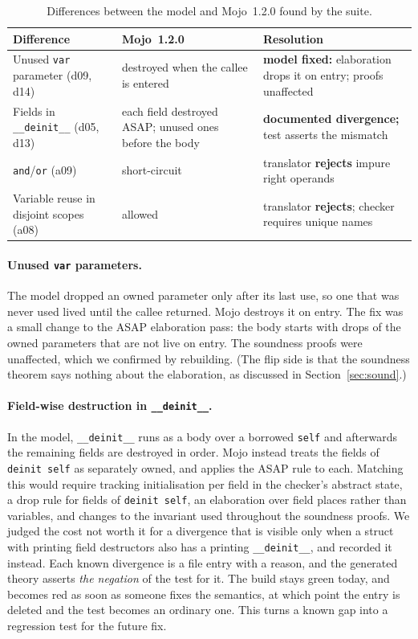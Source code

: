 \documentclass[11pt,a4paper]{article}
\newcommand{\code}[1]{\texttt{#1}}
\begin{document}
\begin{table}[t]
\centering
\begin{tabular}{@{}p{3.2cm}p{5.3cm}p{4.6cm}@{}}
\toprule
Difference & Mojo~1.2.0 & Resolution\\
\midrule
Unused \code{var} parameter (d09, d14) &
 destroyed when the callee is entered &
 \textbf{model fixed:} elaboration drops it on entry; proofs unaffected\\[0.4em]
Fields in \code{\_\_deinit\_\_} (d05, d13) &
 each field destroyed ASAP; unused ones before the body &
 \textbf{documented divergence;} test asserts the mismatch\\[0.4em]
\code{and}/\code{or} (a09) &
 short-circuit &
 translator \textbf{rejects} impure right operands\\[0.4em]
Variable reuse in disjoint scopes (a08) &
 allowed &
 translator \textbf{rejects}; checker requires unique names\\
\bottomrule
\end{tabular}
\caption{Differences between the model and Mojo~1.2.0 found by the suite.}
\label{tab:diffs}
\end{table}

\paragraph{Unused \code{var} parameters.}
The model dropped an owned parameter only after its last use, so one that was
never used lived until the callee returned. Mojo destroys it on entry. The fix
was a small change to the ASAP elaboration pass: the body starts with drops of the
owned parameters that are not live on entry. The soundness proofs
were unaffected, which we confirmed by rebuilding. (The flip side is that the
soundness theorem says nothing about the elaboration, as discussed in
Section~\ref{sec:sound}.)

\paragraph{Field-wise destruction in \code{\_\_deinit\_\_}.}
In the model, \code{\_\_deinit\_\_} runs as a body over a borrowed \code{self}
and afterwards the remaining fields are destroyed in order. Mojo instead treats
the fields of \code{deinit self} as separately owned, and applies the ASAP rule
to each. Matching this would require tracking initialisation per field in the
checker's abstract state, a drop rule for fields of \code{deinit self}, an
elaboration over field places rather than variables, and changes to the
invariant used throughout the soundness proofs. We judged the cost not worth it
for a divergence that is visible only when a struct with printing field
destructors also has a printing \code{\_\_deinit\_\_}, and recorded it instead.
Each known divergence is a file entry with a reason, and the generated theory
asserts \emph{the negation} of the test for it. The build stays green today, and
becomes red as soon as someone fixes the semantics, at which point the entry is
deleted and the test becomes an ordinary one. This turns a known gap into a
regression test for the future fix.
\end{document}
